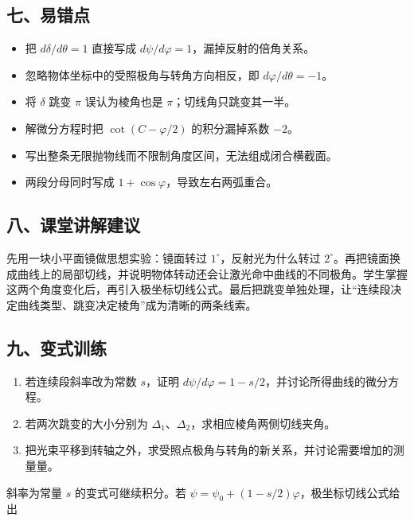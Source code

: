 \documentclass[12pt,a4paper,UTF8]{ctexart}
\newcommand{\tightlist}{\setlength{\itemsep}{0pt}\setlength{\parskip}{0pt}}
\begin{document}
\subsection{七、易错点}\label{ux4e03ux6613ux9519ux70b9-2}

\begin{itemize}
\tightlist
\item
  把 \(d\delta/d\theta=1\) 直接写成
  \(d\psi/d\varphi=1\)，漏掉反射的倍角关系。
\item
  忽略物体坐标中的受照极角与转角方向相反，即 \(d\varphi/d\theta=-1\)。
\item
  将 \(\delta\) 跳变 \(\pi\) 误认为棱角也是
  \(\pi\)；切线角只跳变其一半。
\item
  解微分方程时把 \(\cot(C-\varphi/2)\) 的积分漏掉系数 \(-2\)。
\item
  写出整条无限抛物线而不限制角度区间，无法组成闭合横截面。
\item
  两段分母同时写成 \(1+\cos\varphi\)，导致左右两弧重合。
\end{itemize}

\subsection{八、课堂讲解建议}\label{ux516bux8bfeux5802ux8bb2ux89e3ux5efaux8bae-2}

先用一块小平面镜做思想实验：镜面转过 \(1^\circ\)，反射光为什么转过
\(2^\circ\)。再把镜面换成曲线上的局部切线，并说明物体转动还会让激光命中曲线的不同极角。学生掌握这两个角度变化后，再引入极坐标切线公式。最后把跳变单独处理，让``连续段决定曲线类型、跳变决定棱角''成为清晰的两条线索。

\subsection{九、变式训练}\label{ux4e5dux53d8ux5f0fux8badux7ec3-2}

\begin{enumerate}
\def\labelenumi{\arabic{enumi}.}
\tightlist
\item
  若连续段斜率改为常数 \(s\)，证明
  \(d\psi/d\varphi=1-s/2\)，并讨论所得曲线的微分方程。
\item
  若两次跳变的大小分别为
  \(\Delta_1\)、\(\Delta_2\)，求相应棱角两侧切线夹角。
\item
  把光束平移到转轴之外，求受照点极角与转角的新关系，并讨论需要增加的测量量。
\end{enumerate}

斜率为常量 \(s\) 的变式可继续积分。若
\(\psi=\psi_0+(1-s/2)\varphi\)，极坐标切线公式给出
\end{document}
